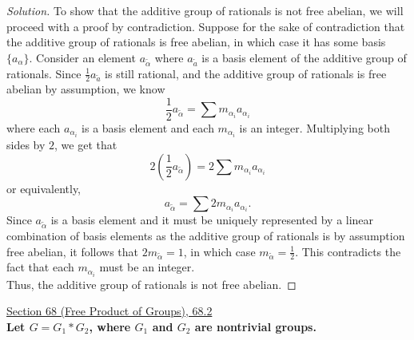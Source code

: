 \documentclass[11pt]{article}
\newenvironment{solution}
  {\renewcommand\qedsymbol{$\blacksquare$}\begin{proof}[Solution]}
  {\end{proof}}
\begin{document}
\begin{enumerate}[b)]
\begin{solution}
        To show that the additive group of rationals is not free abelian, we will proceed with a proof by contradiction. Suppose for the sake of contradiction that the additive group of rationals is free abelian, in which case it has some basis $\{ a_\alpha \}$. 
        Consider an element $a_{\tilde{\alpha}}$ where $a_{\tilde{a}}$ is a basis element of the additive group of rationals. Since $\frac{1}{2}a_{\tilde{a}}$ is still rational, and the additive group of rationals is free abelian by assumption, we know
        \[
            \frac{1}{2}a_{\tilde{\alpha}} = \sum m_{\alpha_i} a_{\alpha_i}
        \]
        where each $a_{\alpha_i}$ is a basis element and each $m_{\alpha_i}$ is an integer. Multiplying both sides by $2$, we get that
        \[
            2\left(\frac{1}{2}a_{\tilde{\alpha}}\right)= 2\sum m_{\alpha_i} a_{\alpha_i}
        \]
        or equivalently, 
        \[
            a_{\tilde{\alpha}} = \sum 2m_{\alpha_i} a_{\alpha_i}.
        \]
        Since $a_{\tilde{\alpha}}$ is a basis element and it must be uniquely represented by a linear combination of basis elements as the additive group of rationals is by assumption free abelian,
        it follows that $2m_{\tilde{\alpha}} = 1$, in which case $m_{\tilde{\alpha}} = \frac{1}{2}$. This contradicts the fact that each $m_{\alpha_i}$ must be an integer. \\
        
        Thus, the additive group of rationals is not free abelian.
    \end{solution}
\end{enumerate}

\newpage

\underline{Section 68 (Free Product of Groups), 68.2} \\

\textbf{Let $G = G_1 * G_2$, where $G_1$ and $G_2$ are nontrivial groups.}
\end{document}
